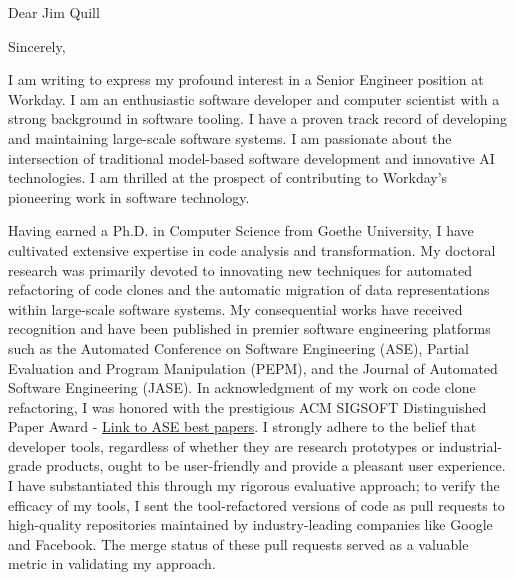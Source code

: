 \documentclass[12pt,a4paper,sans]{moderncv}
\begin{document}
\date{\today}
\opening{Dear Jim Quill}
\closing{Sincerely,}

\makelettertitle

I am writing to express my profound interest in a Senior Engineer position at Workday. I am an enthusiastic software developer and computer scientist with a strong background in software tooling. I have a proven track record of developing and maintaining large-scale software systems. I am passionate about the intersection of traditional model-based software development and innovative AI technologies. I am thrilled at the prospect of contributing to Workday's pioneering work in software technology.

Having earned a Ph.D. in Computer Science from Goethe University, I have cultivated extensive expertise in code analysis and transformation. My doctoral research was primarily devoted to innovating new techniques for automated refactoring of code clones and the automatic migration of data representations within large-scale software systems. My consequential works have received recognition and have been published in premier software engineering platforms such as the Automated Conference on Software Engineering (ASE), Partial Evaluation and Program Manipulation (PEPM), and the Journal of Automated Software Engineering (JASE). In acknowledgment of my work on code clone refactoring, I was honored with the prestigious ACM SIGSOFT Distinguished Paper Award - \href{https://ase-conferences.org/olbib/}{Link to ASE best papers}. I strongly adhere to the belief that developer tools, regardless of whether they are research prototypes or industrial-grade products, ought to be user-friendly and provide a pleasant user experience. I have substantiated this through my rigorous evaluative approach; to verify the efficacy of my tools, I sent the tool-refactored versions of code as pull requests to high-quality repositories maintained by industry-leading companies like Google and Facebook. The merge status of these pull requests served as a valuable metric in validating my approach.
\end{document}
